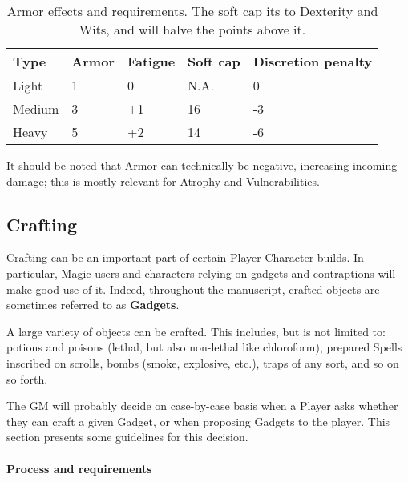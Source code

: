 \begin{table}[h!tbp]
	\begin{center}
		\begin{tabular}{p{1.2cm}p{1.1cm}p{1.3cm}p{1cm}p{1.9cm}} \toprule
			
			\textbf{Type} & \textbf{Armor} & \textbf{Fatigue} & \textbf{Soft cap} & \textbf{Discretion penalty} \\ \midrule
			
			Light & 1 & 0 & N.A. & 0\\
			Medium & 3 & +1 & 16 & -3 \\
			Heavy & 5 & +2 & 14 & -6 \\

			\bottomrule
		\end{tabular}
	\end{center}
	\caption{Armor effects and requirements. The soft cap its to Dexterity and Wits, and will halve the points above it.}
	\label{armor_effects}
\end{table}



It should be noted that Armor can technically be negative, increasing incoming damage; this is mostly relevant for Atrophy and Vulnerabilities.


\subsection{Crafting}

Crafting can be an important part of certain Player Character builds. In particular, Magic users and characters relying on gadgets and contraptions will make good use of it. Indeed, throughout the manuscript, crafted objects are sometimes referred to as \textbf{Gadgets}.

A large variety of objects can be crafted. This includes, but is not limited to: potions and poisons (lethal, but also non-lethal like chloroform), prepared Spells inscribed on scrolls, bombs (smoke, explosive, etc.), traps of any sort, and so on so forth.

The GM will probably decide on case-by-case basis when a Player asks whether they can craft a given Gadget, or when proposing Gadgets to the player. This section presents some guidelines for this decision. 

\label{crafting}

\paragraph{Process and requirements}

